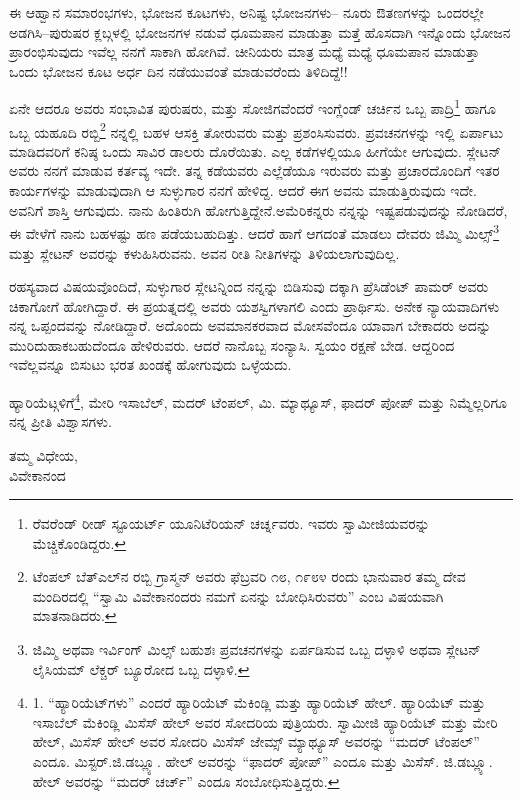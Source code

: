 ಈ ಆಹ್ವಾನ ಸಮಾರಂಭಗಳು, ಭೋಜನ ಕೂಟಗಳು, ಅನಿಷ್ಟ ಭೋಜನಗಳು– ನೂರು ಔತಣಗಳನ್ನು ಒಂದರಲ್ಲೇ ಅಡಗಿಸಿ–ಪುರುಷರ ಕ್ಲಬ್ಗಳಲ್ಲಿ ಭೋಜನಗಳ ನಡುವೆ ಧೂಮಪಾನ ಮಾಡುತ್ತಾ ಮತ್ತೆ ಹೊಸದಾಗಿ ಇನ್ನೊಂದು ಭೋಜನ ಪ್ರಾರಂಭಿಸುವುದು ಇವೆಲ್ಲ ನನಗೆ ಸಾಕಾಗಿ ಹೋಗಿವೆ. ಚೀನಿಯರು ಮಾತ್ರ ಮಧ್ಯೆ ಮಧ್ಯೆ ಧೂಮಪಾನ ಮಾಡುತ್ತಾ ಒಂದು ಭೋಜನ ಕೂಟ ಅರ್ಧ ದಿನ ನಡೆಯುವಂತೆ ಮಾಡುವರೆಂದು ತಿಳಿದಿದ್ದೆ!!

ಏನೇ ಆದರೂ ಅವರು ಸಂಭಾವಿತ ಪುರುಷರು, ಮತ್ತು ಸೋಜಿಗವೆಂದರೆ ಇಂಗ್ಲೆಂಡ್ ಚರ್ಚಿನ ಒಬ್ಬ ಪಾದ್ರಿ\footnote{ರೆವರೆಂಡ್ ರೀಡ್ ಸ್ಟೂಯರ್ಟ್ ಯೂನಿಟೆರಿಯನ್ ಚರ್ಚ್ನವರು. ಇವರು ಸ್ವಾಮೀಜಿಯವರನ್ನು ಮೆಚ್ಚಿಕೊಂಡಿದ್ದರು.} ಹಾಗೂ ಒಬ್ಬ ಯಹೂದಿ ರಬ್ಬಿ\footnote{ಟೆಂಪಲ್ ಬೆತ್ಎಲ್​ನ ರಬ್ಬಿ ಗ್ರಾಸ್ಮನ್ ಅವರು ಫೆಬ್ರವರಿ ೧೮, ೧೯೮೪ ರಂದು ಭಾನುವಾರ ತಮ್ಮ ದೇವ ಮಂದಿರದಲ್ಲಿ “ಸ್ವಾಮಿ ವಿವೇಕಾನಂದರು ನಮಗೆ ಏನನ್ನು ಬೋಧಿಸಿರುವರು” ಎಂಬ ವಿಷಯವಾಗಿ ಮಾತನಾಡಿದರು.} ನನ್ನಲ್ಲಿ ಬಹಳ ಆಸಕ್ತಿ ತೋರುವರು ಮತ್ತು ಪ್ರಶಂಸಿಸುವರು. ಪ್ರವಚನಗಳನ್ನು ಇಲ್ಲಿ ಏರ್ಪಾಟು ಮಾಡಿದವರಿಗೆ ಕನಿಷ್ಠ ಒಂದು ಸಾವಿರ ಡಾಲರು ದೊರೆಯಿತು. ಎಲ್ಲ ಕಡೆಗಳಲ್ಲಿಯೂ ಹೀಗೆಯೇ ಆಗುವುದು. ಸ್ಲೇಟನ್ ಅವರು ನನಗೆ ಮಾಡುವ ಕರ್ತವ್ಯ ಇದೇ. ತನ್ನ ಕಡೆಯವರು ಎಲ್ಲೆಡೆಯೂ ಇರುವರು ಮತ್ತು ಪ್ರಚಾರದೊಂದಿಗೆ ಇತರ ಕಾರ್ಯಗಳನ್ನು ಮಾಡುವುದಾಗಿ ಆ ಸುಳ್ಳುಗಾರ ನನಗೆ ಹೇಳಿದ್ದ. ಆದರೆ ಈಗ ಅವನು ಮಾಡುತ್ತಿರುವುದು ಇದೇ. ಅವನಿಗೆ ಶಾಸ್ತಿ ಆಗುವುದು. ನಾನು ಹಿಂತಿರುಗಿ ಹೋಗುತ್ತಿದ್ದೇನೆ.ಅಮೆರಿಕನ್ನರು ನನ್ನನ್ನು ಇಷ್ಟಪಡುವುದನ್ನು ನೋಡಿದರೆ, ಈ ವೇಳೆಗೆ ನಾನು ಬಹಳಷ್ಟು ಹಣ ಪಡೆಯಬಹುದಿತ್ತು. ಆದರೆ ಹಾಗೆ ಆಗದಂತೆ ಮಾಡಲು ದೇವರು ಜಿಮ್ಮಿ ಮಿಲ್ಸ್\footnote{ಜಿಮ್ಮಿ ಅಥವಾ ಇರ್ವಿಂಗ್ ಮಿಲ್ಸ್ ಬಹುಶಃ ಪ್ರವಚನಗಳನ್ನು ಏರ್ಪಡಿಸುವ ಒಬ್ಬ ದಳ್ಳಾಳಿ ಅಥವಾ ಸ್ಲೇಟನ್ ಲೈಸಿಯಮ್​ ಲೆಕ್ಚರ್ ಬ್ಯೂರೋದ ಒಬ್ಬ ದಳ್ಳಾಳಿ.} ಮತ್ತು ಸ್ಲೇಟನ್ ಅವರನ್ನು ಕಳುಹಿಸಿರುವನು. ಅವನ ರೀತಿ ನೀತಿಗಳನ್ನು ತಿಳಿಯಲಾಗುವುದಿಲ್ಲ.

ರಹಸ್ಯವಾದ ವಿಷಯವೊಂದಿದೆ, ಸುಳ್ಳುಗಾರ ಸ್ಲೇಟನ್ನಿಂದ ನನ್ನನ್ನು ಬಿಡಿಸುವು ದಕ್ಕಾಗಿ ಪ್ರೆಸಿಡೆಂಟ್ ಪಾಮರ್ ಅವರು ಚಿಕಾಗೋಗೆ ಹೋಗಿದ್ದಾರೆ. ಈ ಪ್ರಯತ್ನದಲ್ಲಿ ಅವರು ಯಶಸ್ವಿಗಳಾಗಲಿ ಎಂದು ಪ್ರಾರ್ಥಿಸು. ಅನೇಕ ನ್ಯಾಯವಾದಿಗಳು ನನ್ನ ಒಪ್ಪಂದವನ್ನು ನೋಡಿದ್ದಾರೆ. ಅದೊಂದು ಅವಮಾನಕರವಾದ ಮೋಸವೆಂದೂ ಯಾವಾಗ ಬೇಕಾದರು ಅದನ್ನು ಮುರಿದುಹಾಕಬಹುದೆಂದೂ ಹೇಳಿರುವರು. ಆದರೆ ನಾನೊಬ್ಬ ಸಂನ್ಯಾಸಿ. ಸ್ವಯಂ ರಕ್ಷಣೆ ಬೇಡ. ಆದ್ದರಿಂದ ಇವೆಲ್ಲವನ್ನೂ ಬಿಸುಟು ಭರತ ಖಂಡಕ್ಕೆ ಹೋಗುವುದು ಒಳ್ಳೆಯದು.

ಹ್ಯಾರಿಯೆಟ್ಗಳಿಗೆ\footnote{1. “ಹ್ಯಾರಿಯೆಟ್‌ಗಳು” ಎಂದರೆ ಹ್ಯಾರಿಯೆಟ್ ಮೆಕಿಂಡ್ಲಿ ಮತ್ತು ಹ್ಯಾರಿಯೆಟ್ ಹೇಲ್. ಹ್ಯಾರಿಯೆಟ್ ಮತ್ತು ಇಸಾಬೆಲ್ ಮೆಕಿಂಡ್ಲಿ ಮಿಸೆಸ್ ಹೇಲ್ ಅವರ ಸೋದರಿಯ ಪುತ್ರಿಯರು. ಸ್ವಾಮೀಜಿ ಹ್ಯಾರಿಯೆಟ್ ಮತ್ತು ಮೇರಿ ಹೇಲ್, ಮಿಸೆಸ್ ಹೇಲ್ ಅವರ ಸೋದರಿ ಮಿಸೆಸ್ ಜೇಮ್ಸ್ ಮ್ಯಾಥ್ಯೂಸ್ ಅವರನ್ನು “ಮದರ್ ಟೆಂಪಲ್” ಎಂದೂ. ಮಿಸ್ಟರ್.ಜಿ.ಡಬ್ಲ್ಯೂ. ಹೇಲ್ ಅವರನ್ನು “ಫಾದರ್ ಪೋಪ್” ಎಂದೂ ಮತ್ತು ಮಿಸೆಸ್. ಜಿ.ಡಬ್ಲ್ಯೂ. ಹೇಲ್ ಅವರನ್ನು “ಮದರ್ ಚರ್ಚ್” ಎಂದೂ ಸಂಬೋಧಿಸುತ್ತಿದ್ದರು.}, ಮೇರಿ ಇಸಾಬೆಲ್, ಮದರ್ ಟೆಂಪಲ್, ಮಿ. ಮ್ಯಾಥ್ಯೂಸ್, ಫಾದರ್ ಪೋಪ್ ಮತ್ತು ನಿಮ್ಮೆಲ್ಲರಿಗೂ ನನ್ನ ಪ್ರೀತಿ ವಿಶ್ವಾಸಗಳು.

\begin{flushright}
ತಮ್ಮ ವಿಧೇಯ,\\ವಿವೇಕಾನಂದ
\end{flushright}

